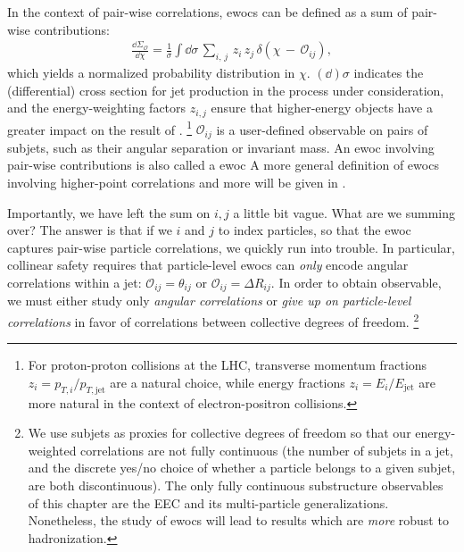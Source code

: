 In the context of pair-wise correlations, \glspl{ewoc} can be defined as a sum of pair-wise contributions:
\begin{align}
    \label{eq:intro_ewoc_def}
    \frac{\dd \Sigma_\mathcal{O}}{\dd \chi}
    =
    \frac{1}{\sigma}
    \int \dd\sigma \,
    \sum_{
        i,\, j
    } \,
    z_i \, z_j \,
    \delta\left(\chi \, - \, \mathcal{O}_{ij}\right)
    ,
\end{align}
which yields a normalized probability distribution in \(\chi\).
%
\((\dd)\sigma\) indicates the (differential) cross section for jet production in the process under consideration, and the energy-weighting factors \(z_{i,j}\) ensure that higher-energy objects have a greater impact on the result of .%
\footnote{
    For proton-proton collisions at the LHC, transverse momentum fractions \(z_i = p_{T,i}/p_{T,\text{jet}}\) are a natural choice, while energy fractions \(z_{i} = E_{i}/E_\text{jet}\) are more natural in the context of electron-positron collisions.
}
%
\(\mathcal{O}_{ij}\) is a user-defined  observable on pairs of subjets, such as their angular separation or invariant mass.
%
An \gls{ewoc} involving pair-wise contributions is also called a  \gls{ewoc}
%
A more general definition of \glspl{ewoc} involving higher-point correlations and more will be given in .

Importantly, we have left the sum on \(i,j\) a little bit vague.
%
What are we summing over?
%
The answer is that if we \(i\) and \(j\) to index particles, so that the \gls{ewoc} captures pair-wise particle correlations, we quickly run into trouble.
%
In particular, collinear safety requires that particle-level \glspl{ewoc} can \textit{only} encode angular correlations within a jet:
%
\(\mathcal{O}_{ij} = \theta_{ij}\) or \(\mathcal{O}_{ij} = \Delta R_{ij}\).
%
In order to obtain  observable, we must either study only \textit{angular correlations} or \textit{give up on particle-level correlations} in favor of correlations between collective degrees of freedom.%
\footnote{
    We use subjets as proxies for collective degrees of freedom so that our energy-weighted correlations are not fully continuous  (the number of subjets in a jet, and the discrete yes/no choice of whether a particle belongs to a given subjet, are both discontinuous).
    The only fully continuous substructure observables of this chapter are the EEC and its multi-particle generalizations.
    Nonetheless, the study of \glspl{ewoc} will lead to results which are \textit{more} robust to hadronization.
}


